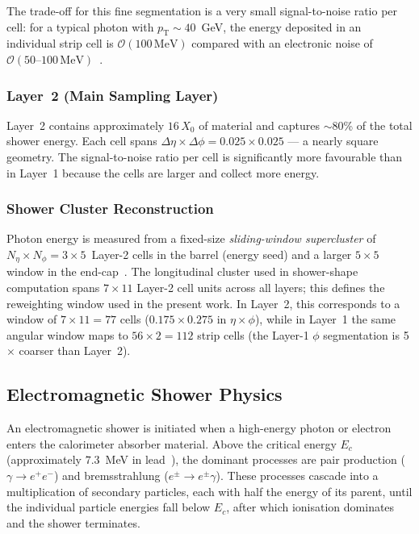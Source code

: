 \documentclass[11pt,a4paper]{article}
\newcommand{\pt}{p_{\mathrm{T}}}
\begin{document}
The trade-off for this fine segmentation is a very small
signal-to-noise ratio per cell: for a typical photon with
$\pt \sim 40$~GeV, the energy deposited in an individual strip cell
is $\mathcal{O}(100\,\mathrm{MeV})$ compared with an electronic noise
of $\mathcal{O}(50\text{--}100\,\mathrm{MeV})$~\cite{LArTDR:1996}.

\subsubsection{Layer~2 (Main Sampling Layer)}
\label{sec:atlas:layer2}

Layer~2 contains approximately $16\,X_0$ of material and captures
$\sim$80\% of the total shower energy.  Each cell spans
$\Delta\eta \times \Delta\phi = 0.025 \times 0.025$ — a nearly
square geometry.  The signal-to-noise ratio per cell is
significantly more favourable than in Layer~1 because the cells are
larger and collect more energy.

\subsubsection{Shower Cluster Reconstruction}
\label{sec:atlas:cluster}

Photon energy is measured from a fixed-size \emph{sliding-window
supercluster} of $N_\eta \times N_\phi = 3 \times 5$~Layer-2 cells
in the barrel (energy seed) and a larger $5 \times 5$ window in the
end-cap~\cite{ATLAS:egammaReco2019,ATLAS:egammaRun3}.  The
longitudinal cluster used in shower-shape computation spans
$7 \times 11$ Layer-2 cell units across all layers; this defines
the reweighting window used in the present work.  In Layer~2, this
corresponds to a window of $7 \times 11 = 77$ cells
($0.175 \times 0.275$ in $\eta \times \phi$), while in Layer~1 the
same angular window maps to $56 \times 2 = 112$ strip cells
(the Layer-1 $\phi$ segmentation is 5$\times$ coarser than Layer~2).

\subsection{Electromagnetic Shower Physics}
\label{sec:atlas:shower}

An electromagnetic shower is initiated when a high-energy photon or
electron enters the calorimeter absorber material.  Above the
critical energy $E_c$ (approximately $7.3$~MeV in lead~\cite{PDG:2024}),
the dominant processes are pair production
($\gamma \to e^+e^-$) and bremsstrahlung ($e^\pm \to e^\pm\gamma$).
These processes cascade into a multiplication of secondary particles,
each with half the energy of its parent, until the individual particle
energies fall below $E_c$, after which ionisation dominates and the
shower terminates.
\end{document}
